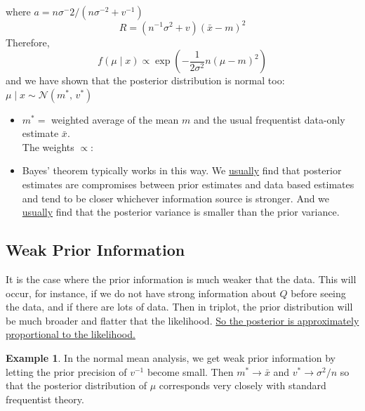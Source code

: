 \documentclass[lecture,12pt,]{pcms-l}
\numberwithin{section}{chapter}
\numberwithin{equation}{chapter}
\theoremstyle{plain}
\theoremstyle{definition}
\newtheorem{example}{Example}[section]
\theoremstyle{definition}
\begin{document}
where $a=n \sigma^-2/(n \sigma^{-2}+v^{-1})$
\begin{equation}
R=(n^{-1}\sigma^2+v)(\bar{x}-m)^2
\end{equation}
Therefore,
\begin{equation}
f(\mu \mid x) \propto \exp\left (  -\frac{1}{2\sigma^2}n(\mu-m)^2 \right )
\end{equation}
and we have shown that the posterior distribution is normal too: $\mu \mid x \sim \mathcal{N}(m^*,\,v^*)$
\begin{itemize}
\item $m^*=$ weighted average of the mean $m$ and the usual frequentist data-only estimate $\bar{x}$. 
\\
The weights $\propto$:
\item Bayes' theorem typically works in this way. We \underline{usually} find that posterior estimates are compromises between prior estimates and data based estimates and tend to be closer whichever information source is stronger. And we \underline{usually} find that the posterior variance is smaller than the prior variance.
\end{itemize}
\subsection{Weak Prior Information}
It is the case where the prior information is much weaker that the data. This will occur, for instance, if we do not have strong information about $Q$ before seeing the  data, and if there are lots of data. Then in triplot, the prior distribution will be much broader and flatter that the likelihood. \underline{So the posterior is approximately proportional to the likelihood.}
\begin{example}
In the normal mean analysis, we get weak prior information by letting the prior precision of $v^{-1}$ become small. Then $m^* \rightarrow \bar{x}$ and $v^* \rightarrow \sigma^2/n$ so that the posterior distribution of $\mu$ corresponds very closely with standard frequentist theory.
\end{example}



\vfill
\eject
\end{document}
